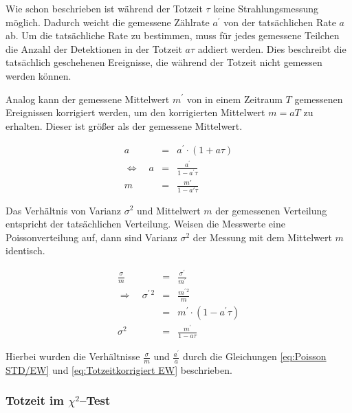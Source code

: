 \documentclass[12pt,a4paper]{scrartcl}
\numberwithin{equation}{section} %
\renewcommand{\[}{} %
\renewcommand{\]}{\noindent} %
\begin{document}
Wie schon beschrieben ist während der Totzeit $\tau$ keine Strahlungsmessung möglich. Dadurch weicht die gemessene Zählrate $a^\prime$ von der tatsächlichen Rate $a$ ab. Um die tatsächliche Rate zu bestimmen, muss für jedes gemessene Teilchen die Anzahl der Detektionen in der Totzeit $a\tau$ addiert werden. Dies beschreibt die tatsächlich geschehenen Ereignisse, die während der Totzeit nicht gemessen werden können.

Analog kann der gemessene Mittelwert $m^\prime$ von in einem Zeitraum $T$ gemessenen Ereignissen korrigiert werden, um den korrigierten Mittelwert $m=aT$ zu erhalten. Dieser ist größer als der gemessene Mittelwert.

\begin{eqnarray}
	a &=& a^\prime \cdot(1 + a\tau) \\
	\Leftrightarrow\quad a &=& \frac{a^\prime}{1-a^\prime\tau} \label{eq:Totzeitkorrigiert Rate}\\
	m &=&\frac{m'}{1-a'\tau} \label{eq:Totzeitkorrigiert EW}
\end{eqnarray}

\noindent
Das Verhältnis von Varianz $\sigma^2$ und Mittelwert $m$ der gemessenen Verteilung entspricht der tatsächlichen Verteilung. Weisen die Messwerte eine Poissonverteilung auf, dann sind Varianz $\sigma^2$ der Messung mit dem Mittelwert $m$ identisch.

\begin{eqnarray}
	\frac{\sigma}{m}&=&\frac{\sigma^\prime}{m^\prime}\\
	\Rightarrow\quad \sigma^{\prime\,2} & = &\frac{m^{\prime\,2}}{m} \\
		&=& m^\prime\cdot(1-a^\prime\tau) \\
	\sigma^2
		&=& \frac{m^\prime}{1-a\tau}
\end{eqnarray}

\noindent
Hierbei wurden die Verhältnisse $\frac{\sigma}{m}$ und $\frac{a^\prime}{a}$ durch die Gleichungen \eqref{eq:Poisson STD/EW} und \eqref{eq:Totzeitkorrigiert EW} beschrieben.

\hypertarget{einfluss-der-totzeit}{%
\subsubsection{Totzeit im $\chi^2$--Test}\label{einfluss-der-totzeit}}
\end{document}
